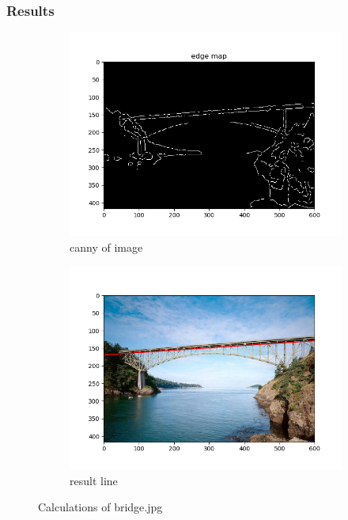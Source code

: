 \documentclass[12pt]{article}
\begin{document}
\subsubsection{Results}
\begin{figure}[!htb]
  \vspace*{-0.5cm}
  \centering
  \begin{subfigure}{.5\textwidth}
    \centering
    \includegraphics[width=0.7\linewidth]{pics/hw3_ex_1_bridge_canny}
    \caption{canny of image}
  \end{subfigure}%
  \begin{subfigure}{.5\textwidth}
    \centering
    \includegraphics[width=0.7\linewidth]{pics/hw3_ex_1_bridge_result}
    \caption{result line}
   \end{subfigure}
  \caption{Calculations of bridge.jpg}
\end{figure}
\end{document}
